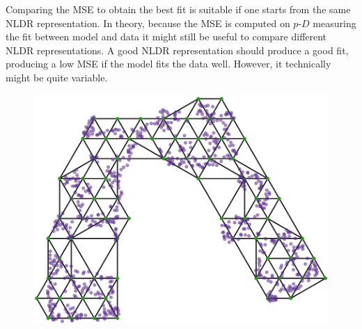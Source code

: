 \documentclass[
  12pt]{article}
\newcommand\pD{$p\text{-}D$}
\begin{document}
Comparing the MSE to obtain the best fit is suitable if one starts from
the same NLDR representation. In theory, because the MSE is computed on
\pD{} measuring the fit between model and data it might still be useful
to compare different NLDR representations. A good NLDR representation
should produce a good fit, producing a low MSE if the model fits the
data well. However, it technically might be quite variable.

\begin{figure}[H]

\begin{minipage}{0.25\linewidth}
\includegraphics{figures/scurve/tsne_trimesh_layout.png}\end{minipage}%
%
\begin{minipage}{0.25\linewidth}

\end{minipage}
\end{figure}
\end{document}
